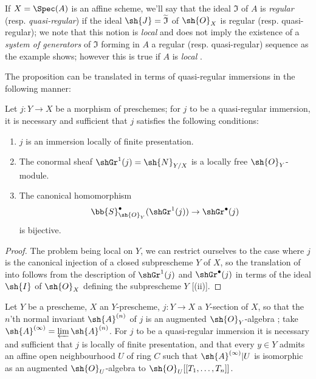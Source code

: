 \begin{env}[16.9.7]
\label{IV.16.9.7}
If $X = \Spec(A)$ is an affine scheme, we'll say that the ideal $\mathfrak{I}$ of $A$ is \emph{regular} (resp. \emph{quasi-regular}) if the ideal $\sh{J} = \widetilde{\mathfrak{I}}$ of $\sh{O}_X$ is regular (resp. quasi-regular);
we note that this notion is \emph{local} and does not imply the existence of a \emph{system of generators} of $\mathfrak{I}$ forming in $A$ a regular (resp. quasi-regular) sequence as the example  shows;
however this is true if $A$ is \emph{local} .

The proposition  can be translated in terms of quasi-regular immersions in the following manner:
\end{env}

\begin{proposition}[16.9.8]
\label{IV.16.9.8}
Let $j:Y \to X$ be a morphism of preschemes;
for $j$ to be a quasi-regular immersion, it is necessary and sufficient that $j$ satisfies the following conditions:
\begin{enumerate}
  \item[(i)] $j$ is an immersion locally of finite presentation.
  \item[(ii)] The conormal sheaf $\shGr^1(j) = \sh{N}_{Y/X}$  is a locally free $\sh{O}_Y$-module.
  \item[(iii)] The canonical homomorphism
  \[
    \bb{S}_{\sh{O}_Y}^\bullet(\shGr^1(j)) \to \shGr^\bullet(j)
  \]
   is bijective.
\end{enumerate}
\end{proposition}

\begin{proof}
The problem being local on $Y$, we can restrict ourselves to the case where $j$ is the canonical injection of a closed subprescheme $Y$ of $X$, so the translation of  into  follows from the description of $\shGr^1(j)$ and $\shGr^\bullet(j)$ in terms of the ideal $\sh{I}$ of $\sh{O}_X$ defining the subprescheme $Y$ [(ii)].
\end{proof}

\begin{corollary}[16.9.9]
\label{IV.16.9.9}
Let $Y$ be a prescheme, $X$ an $Y$-prescheme, $j:Y \to X$ a $Y$-section of $X$, so that the $n$'th normal invariant $\sh{A}^{(n)}$ of $j$  is an augmented $\sh{O}_Y$-algebra ;
take $\sh{A}^{(\infty)} = \varprojlim \sh{A}^{(n)}$.
For $j$ to be a quasi-regular immersion it is necessary and sufficient that $j$ is locally of finite presentation, and that every $y \in Y$ admits an affine open neighbourhood $U$ of ring $C$ such that $\sh{A}^{(\infty)}|U$ is isomorphic as an augmented $\sh{O}_U$-algebra to $\sh{O}_U[[T_1, \dots, T_n]]$.
\end{corollary}

